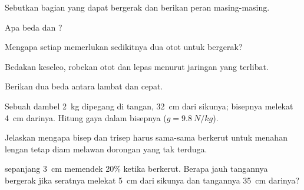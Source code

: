 \begin{exercise}[$\star$]\label{exo:g10:muscles-and-joints:1}
Sebutkan bagian  yang dapat bergerak dan berikan peran masing-masing.
\end{exercise}

\begin{exercise}[$\star$]\label{exo:g10:muscles-and-joints:2}
Apa beda  dan ?
\end{exercise}

\begin{exercise}[$\star$]\label{exo:g10:muscles-and-joints:3}
Mengapa setiap  memerlukan sedikitnya dua otot untuk bergerak?
\end{exercise}

\begin{exercise}[$\star$]\label{exo:g10:muscles-and-joints:4}
Bedakan keseleo, robekan otot dan lepas  menurut jaringan yang
terlibat.
\end{exercise}

\begin{exercise}[$\star$]\label{exo:g10:muscles-and-joints:5}
Berikan dua beda antara  lambat dan  cepat.
\end{exercise}

\begin{exercise}[$\star\star$]\label{exo:g10:muscles-and-joints:6}
Sebuah dambel \qty{2}{kg} dipegang di tangan, \qty{32}{cm} dari
sikunya; bisepnya melekat \qty{4}{cm} darinya. Hitung gaya dalam
bisepnya ($g = \qty{9.8}{N/kg}$).
\end{exercise}

\begin{exercise}[$\star\star$]\label{exo:g10:muscles-and-joints:7}
Jelaskan mengapa bisep dan trisep harus sama-sama berkerut untuk
menahan lengan tetap diam melawan dorongan yang tak terduga.
\end{exercise}

\begin{exercise}[$\star\star$]\label{exo:g10:muscles-and-joints:8}
 sepanjang \qty{3}{cm} memendek 20\% ketika berkerut. Berapa
jauh tangannya bergerak jika  seratnya melekat \qty{5}{cm} dari
sikunya dan tangannya \qty{35}{cm} darinya?
\end{exercise}

